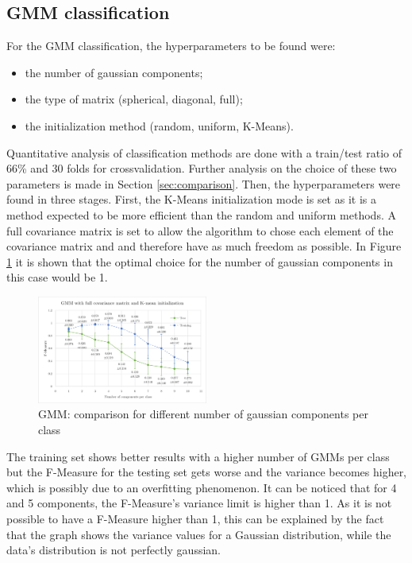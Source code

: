 \documentclass[a4paper,10pt]{article}
\begin{document}
\subsection{GMM classification}
For the GMM classification, the hyperparameters to be found were:

\begin{itemize}
  \item the number of gaussian components;
  \item the type of matrix (spherical, diagonal, full);
  \item the initialization method (random, uniform, K-Means).
\end{itemize}

 
 Quantitative analysis of classification methods are done with a train/test ratio of 66\% and 30 folds for crossvalidation. Further analysis on the choice of these two parameters is made in Section \ref{sec:comparison}. Then, the hyperparameters were found in three stages. First, the K-Means initialization mode is set as it is a method expected to be more efficient than the random and uniform methods. A full covariance matrix is set to allow the algorithm to chose each element of the covariance matrix and and therefore have as much freedom as possible. In Figure \ref{fig:GMM_graph_1} it is shown that the optimal choice for the number of gaussian components in this case would be 1.


\begin{figure}[H]
	\centering
	\includegraphics[width=0.5\textwidth]{pictures/GMM_graph_1}
	\caption{GMM: comparison for different number of gaussian components per class}
	\label{fig:GMM_graph_1}
\end{figure}

The training set shows better results with a higher number of GMMs per class but the F-Measure for the testing set gets worse and the variance becomes higher, which is possibly due to an overfitting phenomenon.
It can be noticed that for 4 and 5 components, the F-Measure's variance limit is higher than 1. As it is not possible to have a F-Measure higher than 1, this can be explained by the fact that the graph shows the variance values for a Gaussian distribution, while the data's distribution is not perfectly gaussian.
\end{document}
